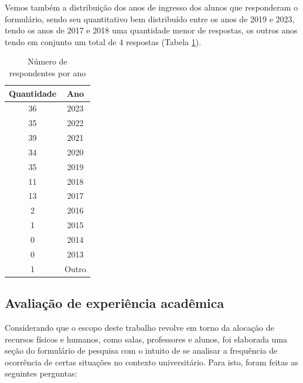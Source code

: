         Vemos também a distribuição dos anos de ingresso dos alunos que responderam o formulário, sendo seu quantitativo bem distribuído entre os anos de 2019 e 2023, tendo os anos de 2017 e 2018 uma quantidade menor de respostas, os outros anos tendo em conjunto um total de 4 respostas (Tabela \ref{table:2.2_SobreVoce_Anos}).

        \begin{table}[htbp]
            \centering
            \caption{\label{table:2.2_SobreVoce_Anos}Número de respondentes por ano}
            \begin{tabular}{| c c |}
                \hline
                    \textbf{Quantidade} & \textbf{Ano} \\
                \hline
                    36 & 2023  \\
                    35 & 2022  \\
                    39 & 2021  \\
                    34 & 2020  \\
                    35 & 2019  \\
                    11 & 2018  \\
                    13 & 2017  \\
                     2 & 2016  \\
                     1 & 2015  \\
                     0 & 2014  \\
                     0 & 2013  \\
                     1 & Outro \\
                \hline
                \end{tabular}
        \end{table}

    \subsection{Avaliação de experiência acadêmica} %

        Considerando que o escopo deste trabalho revolve em torno da alocação de recursos físicos e humanos, como salas, professores e alunos, foi elaborada uma seção do formulário de pesquisa com o intuito de se analisar a frequência de ocorrência de certas situações no contexto universitário. Para isto, foram feitas as seguintes perguntas:

